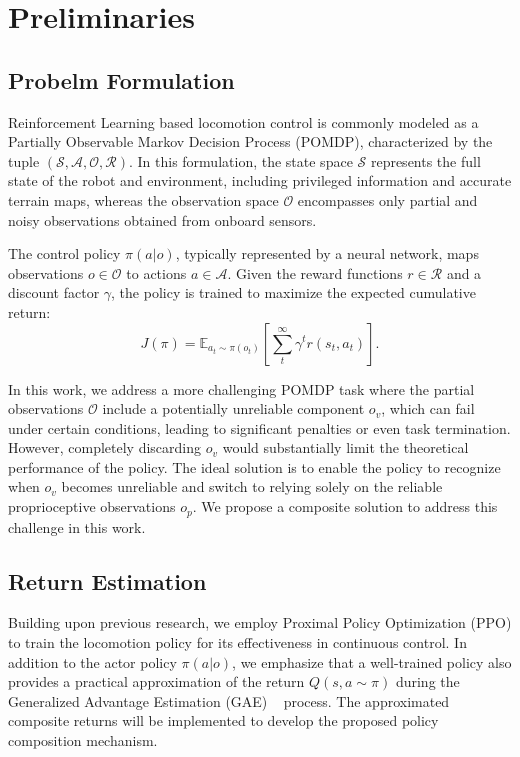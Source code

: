 \section{Preliminaries} \label{sec:preliminaries}

\subsection{Probelm Formulation}
Reinforcement Learning based locomotion control is commonly modeled as a Partially Observable Markov Decision Process (POMDP), characterized by the tuple $(\mathcal{S}, \mathcal{A}, \mathcal{O}, \mathcal{R})$. In this formulation, the state space $\mathcal{S}$ represents the full state of the robot and environment, including privileged information and accurate terrain maps, whereas the observation space $\mathcal{O}$ encompasses only partial and noisy observations obtained from onboard sensors. 

The control policy $\pi(a|o)$, typically represented by a neural network, maps observations $o \in \mathcal{O}$ to actions $a \in \mathcal{A}$. Given the reward functions $r \in \mathcal{R}$ and a discount factor $\gamma$, the policy is trained to maximize the expected cumulative return:
\begin{equation}
    J(\pi) =  \mathbb{E}_{a_t \sim \pi(o_t)}[\sum_{t} ^ \infty \gamma^t r(s_t, a_t)].
\end{equation}

In this work, we address a more challenging POMDP task where the partial observations $\mathcal{O}$ include a potentially unreliable component $o_v$, which can fail under certain conditions, leading to significant penalties or even task termination. However, completely discarding $o_v$ would substantially limit the theoretical performance of the policy. The ideal solution is to enable the policy to recognize when $o_v$ becomes unreliable and switch to relying solely on the reliable proprioceptive observations $o_p$. We propose a composite solution to address this challenge in this work.


\subsection{Return Estimation}

Building upon previous research, we employ Proximal Policy Optimization (PPO) to train the locomotion policy for its effectiveness in continuous control. In addition to the actor policy $\pi(a|o)$, we emphasize that a well-trained policy also provides a practical approximation of the return $Q(s, a \sim \pi)$ during the Generalized Advantage Estimation (GAE) ~\cite{schulman2015high} process. The approximated composite returns will be implemented to develop the proposed policy composition mechanism.

